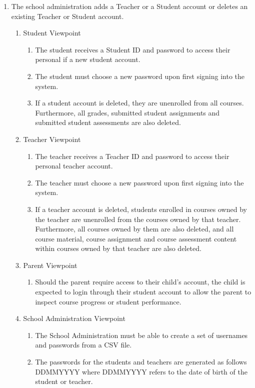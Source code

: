 \documentclass[]{article}
\begin{document}
\begin{enumerate}[{BE}1.]
	\item The school administration adds a Teacher or a Student account or deletes an existing Teacher or Student account.
	\begin{enumerate}[{VP1}.1]
		\item Student Viewpoint
			\begin{enumerate}
				\item The student receives a Student ID and password to access their personal if a new student account.
				\item The student must choose a new password upon first signing into the system.
				\item If a student account is deleted, they are unenrolled from all courses. Furthermore, all grades, submitted student assignments and submitted student assessments are also deleted.
			\end{enumerate}
		\item Teacher Viewpoint
			\begin{enumerate}
				\item The teacher receives a Teacher ID and password to access their personal teacher account.
				\item The teacher must choose a new password upon first signing into the system.
				\item If a teacher account is deleted, students enrolled in courses owned by the teacher are unenrolled from the courses owned by that teacher. Furthermore, all courses owned by them are also deleted, and all course material, course assignment and course assessment content within courses owned by that teacher are also deleted.
			\end{enumerate}
		\item Parent Viewpoint
			\begin{enumerate}
				\item Should the parent require access to their child's account, the child is expected to login through their student account to allow the parent to inspect course progress or student performance.
			\end{enumerate}
		\item School Administration Viewpoint
			\begin{enumerate}
				\item The School Administration must be able to create a set of usernames and passwords from a CSV file.
				\item The passwords for the students and teachers are generated as follows DDMMYYYY where DDMMYYYY refers to the date of birth of the student or teacher.

\end{enumerate}
\end{enumerate}
\end{enumerate}
\end{document}

